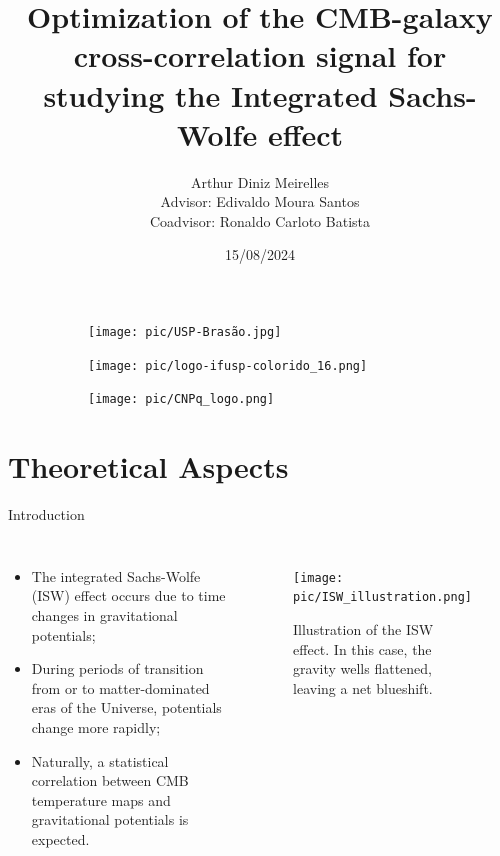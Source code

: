 \documentclass[serif, aspectratio=169]{beamer}
\author{Arthur Diniz Meirelles \\
	\vspace{0.2cm}
	\small Advisor: Edivaldo Moura Santos \\
	\small Coadvisor: Ronaldo Carloto Batista}
\title{Optimization of the CMB-galaxy cross-correlation signal for studying the Integrated Sachs-Wolfe effect}
\institute{
    Institute of Physics \\
    Universidade de São Paulo
}
\date{\small 15/08/2024}
\begin{document}
\begin{frame}
	\titlepage
    \vspace*{-1.5cm}
    \begin{figure}[htpb]
    \centering
    \begin{subfigure}[t]{0.17\textwidth}
        \centering
        \texttt{[image: pic/USP-Brasão.jpg]}
    \end{subfigure}
    \begin{subfigure}[t]{0.25\textwidth}
        \centering
        \texttt{[image: pic/logo-ifusp-colorido\_16.png]}
    \end{subfigure}
    \hfill
    \begin{subfigure}[t]{0.25\textwidth}
        \centering
        \texttt{[image: pic/CNPq\_logo.png]}
    \end{subfigure}
    \end{figure}
\end{frame}

\begin{frame}    
\tableofcontents[sectionstyle=show,
subsectionstyle=show/shaded/hide,
subsubsectionstyle=show/shaded/hide]
\end{frame}


\section{Theoretical Aspects}

\begin{frame}{Introduction}
    \begin{columns}
        \begin{itemize}
        \item The integrated Sachs-Wolfe (ISW) effect occurs due to time changes in gravitational potentials;
        \item During periods of transition from or to matter-dominated eras of the Universe, potentials change more rapidly;
        \item Naturally, a statistical correlation between CMB temperature maps and gravitational potentials is expected.
        \end{itemize}
        \begin{figure}
            \centering
            \texttt{[image: pic/ISW\_illustration.png]}
            \caption{Illustration of the ISW effect. In this case, the gravity wells flattened, leaving a net blueshift.}
            \label{fig:ISW_illustration}
        \end{figure}
    \end{columns}
\end{frame}
\end{document}
